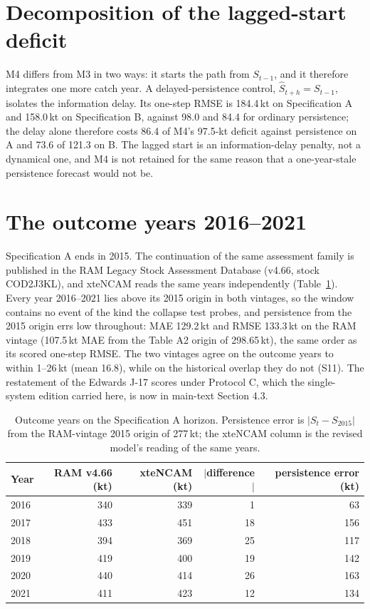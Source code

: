 \section{Decomposition of the lagged-start deficit}\label{si:m4}

M4 differs from M3 in two ways: it starts the path from $S_{t-1}$, and it therefore integrates one more catch year. A delayed-persistence control, $\hat S_{t+h} = S_{t-1}$, isolates the information delay. Its one-step RMSE is 184.4\,kt on Specification A and 158.0\,kt on Specification B, against 98.0 and 84.4 for ordinary persistence; the delay alone therefore costs 86.4 of M4's 97.5-kt deficit against persistence on A and 73.6 of 121.3 on B. The lagged start is an information-delay penalty, not a dynamical one, and M4 is not retained for the same reason that a one-year-stale persistence forecast would not be.

\FloatBarrier
\section{The outcome years 2016--2021}\label{si:outcome}

Specification A ends in 2015. The continuation of the same assessment family is published in the RAM Legacy Stock Assessment Database (v4.66, stock COD2J3KL), and xteNCAM reads the same years independently (Table~\ref{tab:si_outcome}). Every year 2016--2021 lies above its 2015 origin in both vintages, so the window contains no event of the kind the collapse test probes, and persistence from the 2015 origin errs low throughout: MAE 129.2\,kt and RMSE 133.3\,kt on the RAM vintage (107.5\,kt MAE from the Table A2 origin of 298.65\,kt), the same order as its scored one-step RMSE. The two vintages agree on the outcome years to within 1--26\,kt (mean 16.8), while on the historical overlap they do not (S11). The restatement of the Edwards J-17 scores under Protocol C, which the single-system edition carried here, is now in main-text Section 4.3.

\begin{table}[!htb]
\centering\small
\caption{Outcome years on the Specification A horizon. Persistence error is $|S_t - S_{2015}|$ from the RAM-vintage 2015 origin of 277\,kt; the xteNCAM column is the revised model's reading of the same years.}
\label{tab:si_outcome}
\begin{tabular}{@{}lrrrr@{}}
\toprule
Year & RAM v4.66 (kt) & xteNCAM (kt) & $|$difference$|$ & persistence error (kt) \\
\midrule
2016 & 340 & 339 & 1 & 63 \\
2017 & 433 & 451 & 18 & 156 \\
2018 & 394 & 369 & 25 & 117 \\
2019 & 419 & 400 & 19 & 142 \\
2020 & 440 & 414 & 26 & 163 \\
2021 & 411 & 423 & 12 & 134 \\
\bottomrule
\end{tabular}
\end{table}
